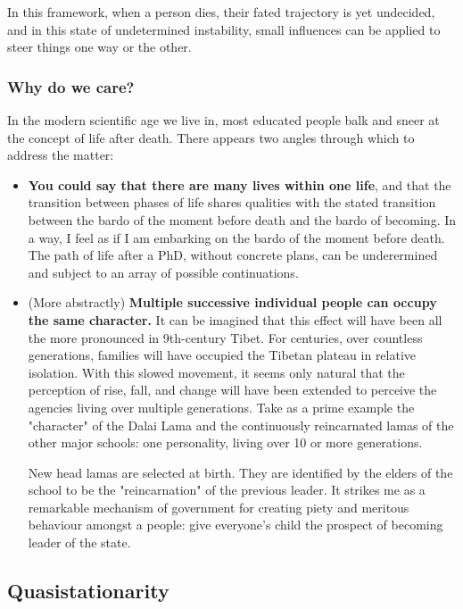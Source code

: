 In this framework, when a person dies, their fated trajectory is yet undecided, and in this state of undetermined instability, small influences can be applied to steer things one way or the other.

\subsubsection*{Why do we care?} In the modern scientific age we live in, most educated people balk and sneer at the concept of life after death.  There appears two angles through which to address the matter:

\begin{itemize} \item \textbf{You could say that there are many lives within one life}, and that the transition between phases of life shares qualities with the stated transition between the bardo of the moment before death and the bardo of becoming. In a way, I feel as if I am embarking on the bardo of the moment before death.  The path of life after a PhD, without concrete plans, can be underermined and subject to an array of possible continuations. 

\item (More abstractly) \textbf{Multiple successive individual people can occupy the same character.} It can be imagined that this effect will have been all the more pronounced in 9th-century Tibet. For centuries, over countless generations, families will have occupied the Tibetan plateau in relative isolation. With this slowed movement, it seems only natural that the perception of rise, fall, and change will have been extended to perceive the agencies living over multiple generations. Take as a prime example the "character" of the Dalai Lama and the continuously reincarnated lamas of the other major schools: one personality, living over 10 or more generations.

New head lamas are selected at birth. They are identified by the elders of the school to be the "reincarnation" of the previous leader. It strikes me as a remarkable mechanism of government for creating piety and meritous behaviour amongst a people: give everyone's child the prospect of becoming leader of the state.

\end{itemize}

\subsection*{Quasistationarity} 

